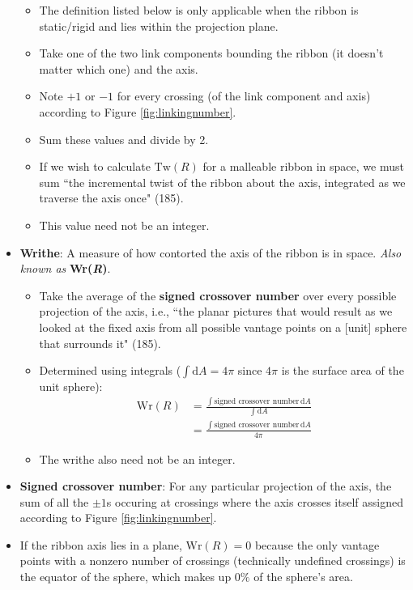 \documentclass[titlepage]{article}
\numberwithin{figure}{section}
\numberwithin{table}{section}
\numberwithin{equation}{section}
\newcommand{\dq}[2]{``#1" (#2).}
\begin{document}
\begin{itemize}
    \begin{itemize}
        \item The definition listed below is only applicable when the ribbon is static/rigid and lies within the projection plane.
        \item Take one of the two link components bounding the ribbon (it doesn't matter which one) and the axis.
        \item Note $+1$ or $-1$ for every crossing (of the link component and axis) according to Figure \ref{fig:linkingnumber}.
        \item Sum these values and divide by 2.
        \item If we wish to calculate $\text{Tw}(R)$ for a malleable ribbon in space, we must sum \dq{the incremental twist of the ribbon about the axis, integrated as we traverse the axis once}{185}
        \item This value need not be an integer.
    \end{itemize}
    \item \textbf{Writhe}: A measure of how contorted the axis of the ribbon is in space. \emph{Also known as} \textbf{Wr(\emph{R})}.
    \begin{itemize}
        \item Take the average of the \textbf{signed crossover number} over every possible projection of the axis, i.e., \dq{the planar pictures that would result as we looked at the fixed axis from all possible vantage points on a [unit] sphere that surrounds it}{185}
        \item Determined using integrals ($\int\text{d}A=4\pi$ since $4\pi$ is the surface area of the unit sphere):
        \begin{align*}
            \text{Wr}(R) &= \frac{\int\text{signed crossover number}\,\text{d}A}{\int\text{d}A}\\
            &= \frac{\int\text{signed crossover number}\,\text{d}A}{4\pi}
        \end{align*}
        \item The writhe also need not be an integer.
    \end{itemize}
    \item \textbf{Signed crossover number}: For any particular projection of the axis, the sum of all the $\pm 1$s occuring at crossings where the axis crosses itself assigned according to Figure \ref{fig:linkingnumber}.
    \item If the ribbon axis lies in a plane, $\text{Wr}(R)=0$ because the only vantage points with a nonzero number of crossings (technically undefined crossings) is the equator of the sphere, which makes up $0\%$ of the sphere's area.

\end{itemize}
\end{document}
